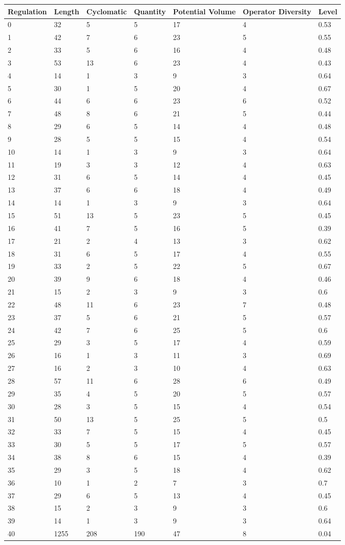 \begin{tabular}{lllllll}
Regulation & Length & Cyclomatic & Quantity & Potential Volume & Operator Diversity & Level \\ 
\hline 
0 & 32 & 5 & 5 & 17 & 4 & 0.53 \\ 
1 & 42 & 7 & 6 & 23 & 5 & 0.55 \\ 
2 & 33 & 5 & 6 & 16 & 4 & 0.48 \\ 
3 & 53 & 13 & 6 & 23 & 4 & 0.43 \\ 
4 & 14 & 1 & 3 & 9 & 3 & 0.64 \\ 
5 & 30 & 1 & 5 & 20 & 4 & 0.67 \\ 
6 & 44 & 6 & 6 & 23 & 6 & 0.52 \\ 
7 & 48 & 8 & 6 & 21 & 5 & 0.44 \\ 
8 & 29 & 6 & 5 & 14 & 4 & 0.48 \\ 
9 & 28 & 5 & 5 & 15 & 4 & 0.54 \\ 
10 & 14 & 1 & 3 & 9 & 3 & 0.64 \\ 
11 & 19 & 3 & 3 & 12 & 4 & 0.63 \\ 
12 & 31 & 6 & 5 & 14 & 4 & 0.45 \\ 
13 & 37 & 6 & 6 & 18 & 4 & 0.49 \\ 
14 & 14 & 1 & 3 & 9 & 3 & 0.64 \\ 
15 & 51 & 13 & 5 & 23 & 5 & 0.45 \\ 
16 & 41 & 7 & 5 & 16 & 5 & 0.39 \\ 
17 & 21 & 2 & 4 & 13 & 3 & 0.62 \\ 
18 & 31 & 6 & 5 & 17 & 4 & 0.55 \\ 
19 & 33 & 2 & 5 & 22 & 5 & 0.67 \\ 
20 & 39 & 9 & 6 & 18 & 4 & 0.46 \\ 
21 & 15 & 2 & 3 & 9 & 3 & 0.6 \\ 
22 & 48 & 11 & 6 & 23 & 7 & 0.48 \\ 
23 & 37 & 5 & 6 & 21 & 5 & 0.57 \\ 
24 & 42 & 7 & 6 & 25 & 5 & 0.6 \\ 
25 & 29 & 3 & 5 & 17 & 4 & 0.59 \\ 
26 & 16 & 1 & 3 & 11 & 3 & 0.69 \\ 
27 & 16 & 2 & 3 & 10 & 4 & 0.63 \\ 
28 & 57 & 11 & 6 & 28 & 6 & 0.49 \\ 
29 & 35 & 4 & 5 & 20 & 5 & 0.57 \\ 
30 & 28 & 3 & 5 & 15 & 4 & 0.54 \\ 
31 & 50 & 13 & 5 & 25 & 5 & 0.5 \\ 
32 & 33 & 7 & 5 & 15 & 4 & 0.45 \\ 
33 & 30 & 5 & 5 & 17 & 5 & 0.57 \\ 
34 & 38 & 8 & 6 & 15 & 4 & 0.39 \\ 
35 & 29 & 3 & 5 & 18 & 4 & 0.62 \\ 
36 & 10 & 1 & 2 & 7 & 3 & 0.7 \\ 
37 & 29 & 6 & 5 & 13 & 4 & 0.45 \\ 
38 & 15 & 2 & 3 & 9 & 3 & 0.6 \\ 
39 & 14 & 1 & 3 & 9 & 3 & 0.64 \\ 
40 & 1255 & 208 & 190 & 47 & 8 & 0.04 \\ 
\hline 
\end{tabular}
